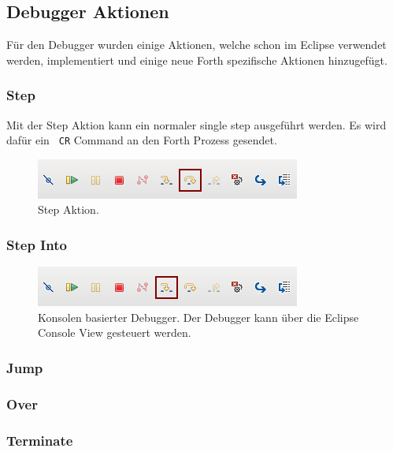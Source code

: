 \subsection{Debugger Aktionen}

Für den Debugger wurden einige Aktionen, welche schon im Eclipse verwendet werden, implementiert und einige neue Forth spezifische Aktionen hinzugefügt.

\subsubsection{Step}
Mit der Step Aktion kann ein normaler single step ausgeführt werden. Es wird dafür ein \verb! CR! Command an den Forth Prozess gesendet.
\begin{figure}[H]
	\centering
		\includegraphics[scale=1]{debugger/step.png}
		\caption{Step Aktion.}
		\label{fig:extensionpoint}
\end{figure}

\subsubsection{Step Into}

\begin{figure}[H]
	\centering
		\includegraphics[scale=1]{debugger/stepinto.png}
		\caption{Konsolen basierter Debugger. Der Debugger kann über die Eclipse Console View gesteuert werden.}
		\label{fig:extensionpoint}
\end{figure}

\subsubsection{Jump}

\subsubsection{Over}

\subsubsection{Terminate}

